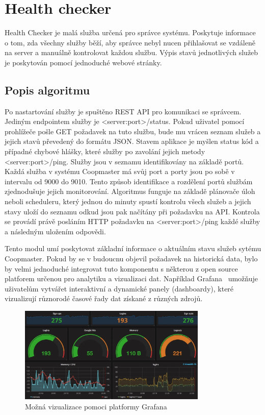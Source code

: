 \section{Health checker}\label{sec:health-checker}
Health Checker je malá služba určená pro správce systému.
Poskytuje informace o tom, zda všechny služby běží, aby správce nebyl nucen přihlašovat se vzdáleně na server a manuálně kontrolovat každou službu.
Výpis stavů jednotlivých služeb je poskytován pomocí jednoduché webové stránky.

\subsection*{Popis algoritmu}
Po nastartování služby je spuštěno REST API pro komunikaci se správcem.
Jediným endpointem služby je <server:port>/status.
Pokud uživatel pomocí prohlížeče pošle GET požadavek na tuto službu, bude mu vrácen seznam služeb a jejich stavů převedený do formátu JSON.
Stavem aplikace je myšlen status kód a případné chybové hlášky, které služby po zavolání jejich metody <server:port>/ping.
Služby jsou v seznamu identifikovány na základě portů.
Každá služba v systému Coopmaster má svůj port a porty jsou po sobě v intervalu od 9000 do 9010.
Tento způsob identifikace a rozdělení portů službám zjednodušuje jejich monitorování.
Algoritmus funguje na základě plánovače úloh neboli scheduleru, který jednou do minuty spustí kontrolu všech služeb a jejich stavy uloží do seznamu odkud jsou pak načítány při požadavku na API.
Kontrola se provádí právě posláním HTTP požadavku na <server:port>/ping každé služby a následným uložením odpovědi.

Tento modul umí poskytovat základní informace o aktuálním stavu služeb sytému Coopmaster.
Pokud by se v budoucnu objevil požadavek na historická data, bylo by velmi jednoduché integrovat tuto komponentu s některou z open source platforem určenou pro analytiku a vizualizaci dat.
Například Grafana~\cite{grafana} umožňuje uživatelům vytvářet interaktivní a dynamické panely (dashboardy), které vizualizují různorodé časové řady dat získané z různých zdrojů.


\begin{figure}[h]
    \centering
    \includegraphics[width=0.8\textwidth]{img/health-checker-grafana-dashboard}
    \caption{Možná vizualizace pomoci platformy Grafana}
    \label{fig:health-checker-grafana-dashboard}
\end{figure}


